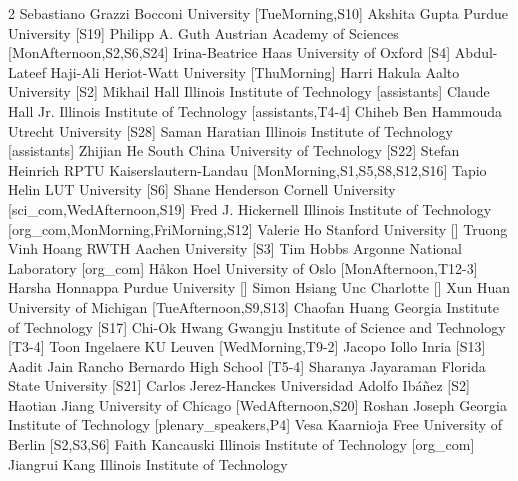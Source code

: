 \begin{multicols}{2}
\participantne
  {Sebastiano Grazzi}
  {Bocconi University}
  [TueMorning,S10]
\participantne
  {Akshita Gupta}
  {Purdue University}
  [S19]
\participantne
  {Philipp A. Guth}
  {Austrian Academy of Sciences}
  [MonAfternoon,S2,S6,S24]
\participantne
  {Irina-Beatrice Haas}
  {University of Oxford}
  [S4]
\participantne
  {Abdul-Lateef Haji-Ali}
  {Heriot-Watt University}
  [ThuMorning]
\participantne
  {Harri Hakula}
  {Aalto University}
  [S2]
\participantne
  {Mikhail Hall}
  {Illinois Institute of Technology}
  [assistants]
\participantne
  {Claude Hall Jr.}
  {Illinois Institute of Technology}
  [assistants,T4-4]
\participantne
  {Chiheb Ben Hammouda}
  {Utrecht University}
  [S28]
\participantne
  {Saman Haratian}
  {Illinois Institute of Technology}
  [assistants]
\participantne
  {Zhijian He}
  {South China University of Technology}
  [S22]
\participantne
  {Stefan Heinrich}
  {RPTU Kaiserslautern-Landau}
  [MonMorning,S1,S5,S8,S12,S16]
\participantne
  {Tapio Helin}
  {LUT University}
  [S6]
\participantne
  {Shane Henderson}
  {Cornell University}
  [sci_com,WedAfternoon,S19]
\participantne
  {Fred J. Hickernell}
  {Illinois Institute of Technology}
  [org_com,MonMorning,FriMorning,S12]
\participantne
  {Valerie Ho}
  {Stanford University}
  []
\participantne
  {Truong Vinh Hoang}
  {RWTH Aachen University}
  [S3]
\participantne
  {Tim Hobbs}
  {Argonne National Laboratory}
  [org_com]
\participantne
  {H{\aa}kon Hoel}
  {University of Oslo}
  [MonAfternoon,T12-3]
\participantne
  {Harsha Honnappa}
  {Purdue University}
  []
\participantne
  {Simon Hsiang}
  {Unc Charlotte}
  []
\participantne
  {Xun Huan}
  {University of Michigan}
  [TueAfternoon,S9,S13]
\participantne
  {Chaofan Huang}
  {Georgia Institute of Technology}
  [S17]
\participantne
  {Chi-Ok Hwang}
  {Gwangju Institute of Science and Technology}
  [T3-4]
\participantne
  {Toon Ingelaere}
  {KU Leuven}
  [WedMorning,T9-2]
\participantne
  {Jacopo Iollo}
  {Inria}
  [S13]
\participantne
  {Aadit Jain}
  {Rancho Bernardo High School}
  [T5-4]
\participantne
  {Sharanya Jayaraman}
  {Florida State University}
  [S21]
\participantne
  {Carlos Jerez-Hanckes}
  {Universidad Adolfo Ib\'a\~nez}
  [S2]
\participantne
  {Haotian Jiang}
  {University of Chicago}
  [WedAfternoon,S20]
\participantne
  {Roshan Joseph}
  {Georgia Institute of Technology}
  [plenary_speakers,P4]
\participantne
  {Vesa Kaarnioja}
  {Free University of Berlin}
  [S2,S3,S6]
\participantne
  {Faith Kancauski}
  {Illinois Institute of Technology}
  [org_com]
\participantne
  {Jiangrui Kang}
  {Illinois Institute of Technology}

\end{multicols}
